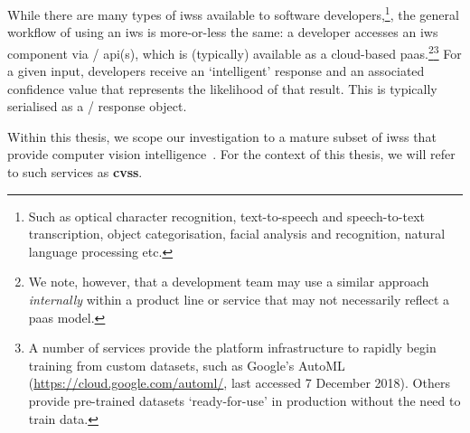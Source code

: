 While there are many types of \glspl{iws} available to software developers,\footnote{Such as optical character recognition, text-to-speech and speech-to-text transcription, object categorisation, facial analysis and recognition, natural language processing etc.}, the general workflow of using an \gls{iws} is more-or-less the same: a developer accesses an \gls{iws} component via / \gls{api}(s), which is (typically) available as a cloud-based \gls{paas}.\footnote{We note, however, that a development team may use a similar approach \textit{internally} within a product line or service that may not necessarily reflect a \gls{paas} model.}\footnote{A number of services provide the platform infrastructure to rapidly begin training from custom datasets, such as Google's AutoML (\url{https://cloud.google.com/automl/}, last accessed 7 December 2018). Others provide pre-trained datasets `ready-for-use' in production without the need to train data.} For a given input, developers receive an `intelligent' response and an associated confidence value that represents the likelihood of that result. This is typically serialised as a / response object. 


\begin{callout}
Within this thesis, we scope our investigation to a mature \textup{subset} of \glspl{iws} that provide computer vision intelligence~. For the context of this thesis, we will refer to such services as \textbf{\glspl{cvs}}. 
\end{callout}



